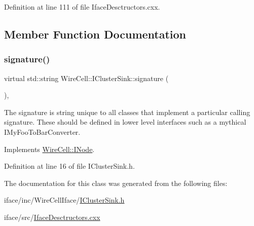 Definition at line 111 of file Iface\+Desctructors.\+cxx.



\subsection{Member Function Documentation}
\mbox{\label{class_wire_cell_1_1_i_cluster_sink_a0c940c8291898c059685fb78dcafa37c}} 
\subsubsection{\texorpdfstring{signature()}{signature()}}
{\footnotesize\ttfamily virtual std\+::string Wire\+Cell\+::\+I\+Cluster\+Sink\+::signature (\begin{DoxyParamCaption}{ }\end{DoxyParamCaption})\hspace{0.3cm}{\ttfamily [inline]}, {\ttfamily [virtual]}}

The signature is string unique to all classes that implement a particular calling signature. These should be defined in lower level interfaces such as a mythical I\+My\+Foo\+To\+Bar\+Converter. 

Implements \hyperlink{class_wire_cell_1_1_i_node_a0b0763465adf5ba7febe8e378162b584}{Wire\+Cell\+::\+I\+Node}.



Definition at line 16 of file I\+Cluster\+Sink.\+h.



The documentation for this class was generated from the following files\+:\begin{DoxyCompactItemize}
\item 
iface/inc/\+Wire\+Cell\+Iface/\hyperlink{_i_cluster_sink_8h}{I\+Cluster\+Sink.\+h}\item 
iface/src/\hyperlink{_iface_desctructors_8cxx}{Iface\+Desctructors.\+cxx}\end{DoxyCompactItemize}
